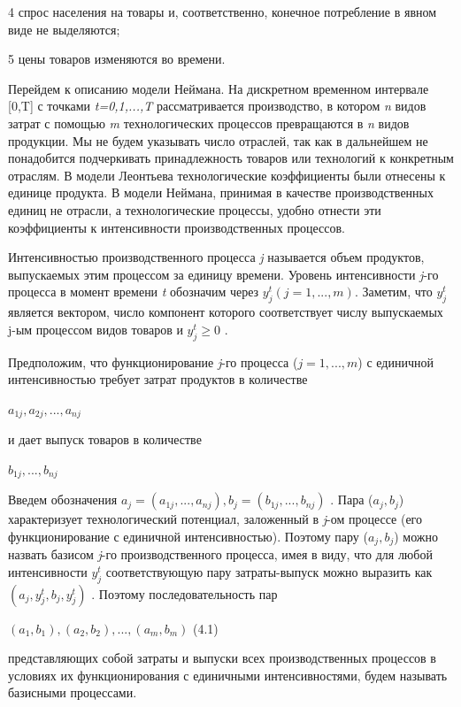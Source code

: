 \documentclass[12pt, 4paper]{book}
\begin{document}
{4 спрос населения на товары и, соответственно, конечное потребление в явном виде не выделяются;
\par

5 цены товаров изменяются во времени.
\par

Перейдем к описанию модели Неймана. На дискретном временном интервале [0,T] с точками \textit{t=0,1,...,T} рассматривается производство, в котором \textit{n} видов затрат с помощью \textit{m} технологических процессов превращаются в \textit{n} видов продукции. Мы не будем указывать число отраслей, так как в дальнейшем не понадобится подчеркивать принадлежность товаров или технологий к конкретным отраслям. В модели Леонтьева технологические коэффициенты были отнесены к единице продукта. В модели Неймана, принимая в качестве производственных единиц не отрасли, а технологические процессы, удобно отнести эти коэффициенты к интенсивности производственных процессов.
\par

Интенсивностью производственного процесса \textit{j} называется объем продуктов, выпускаемых этим процессом за единицу времени. Уровень интенсивности \textit{j}-го процесса в момент времени \textit{t} обозначим через $y_{j}^t(j=1,...,m)$. Заметим, что $y_{j}^{t}$  является вектором, число компонент которого соответствует числу выпускаемых j-ым процессом видов товаров и $y_{j}^t \geq 0$ .
\par

Предположим, что функционирование \textit{j}-го процесса ($j=1,...,m$) с единичной интенсивностью требует затрат продуктов в количестве
\begin{center}
$a_{1j},a_{2j},...,a_{nj}$
\end{center}
и дает выпуск товаров в количестве
\begin{center}
$b_{1j},...,b_{nj}$
\end{center}
\par

Введем обозначения $a_j=(a_{1j},...,a_{nj}),b_{j}=(b_{1j},...,b_{nj})$ . Пара ($a_j,b_j$) характеризует технологический потенциал, заложенный в \textit{j}-ом процессе (его функционирование с единичной интенсивностью). Поэтому пару ($a_j,b_j$) можно назвать базисом \textit{j}-го производственного процесса, имея в виду, что для любой интенсивности $y_{j}^t$ соответствующую пару затраты-выпуск можно выразить как $(a_j,y_{j}^t,b_j,y_{j}^t)$ . Поэтому последовательность пар
\begin{center}
$(a_1,b_1),(a_2,b_2),...,(a_m,b_m)$ (4.1)
\end{center}
представляющих собой затраты и выпуски всех производственных процессов в условиях их функционирования с единичными интенсивностями, будем называть базисными процессами.
\par

}
\end{document}
